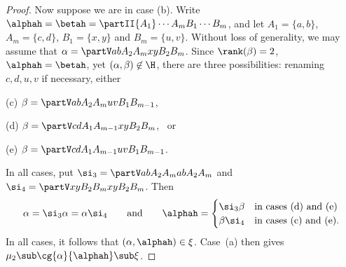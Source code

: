 \begin{proof}
Now suppose we are in case (b).  Write $\alphah=\betah=\partII{A_1}\cdots{A_m}{B_1}\cdots{B_m}$, and let $A_1=\{a,b\}$, $A_m=\{c,d\}$, $B_1=\{x,y\}$ and $B_m=\{u,v\}$.  Without loss of generality, we may assume that $\alpha=\partV ab{A_2}{A_m}xy{B_2}{B_m}$.  Since $\rank(\beta)=2$, $\alphah=\betah$, yet $(\alpha,\beta)\not\in{\H}$, there are three possibilities: renaming $c,d,u,v$ if necessary, either
\begin{itemize}\begin{multicols}{3}
\item[(c)] $\beta=\partV ab{A_2}{A_m}uv{B_1}{B_{m-1}}$, 
\item[(d)] $\beta=\partV cd{A_1}{A_{m-1}}xy{B_2}{B_m}$, \ or
\item[(e)] $\beta=\partV cd{A_1}{A_{m-1}}uv{B_1}{B_{m-1}}$.
\end{multicols}\end{itemize}
In all cases, put $\si_3=\partV ab{A_2}{A_m}ab{A_2}{A_m}$ and $\si_4=\partV xy{B_2}{B_m}xy{B_2}{B_m}$.  Then 
\[
\alpha=\si_3\alpha=\alpha\si_4
\qquad\text{and}\qquad
\alphah=\begin{cases}
\si_3\beta &\text{in cases (d) and (e)}\\
\beta\si_4 &\text{in cases (c) and (e).}
\end{cases}
\]
In all cases, it follows that $(\alpha,\alphah)\in \xi$.
Case~(a) then gives $\mu_2\sub\cg{\alpha}{\alphah}\sub\xi$.


\end{proof}
